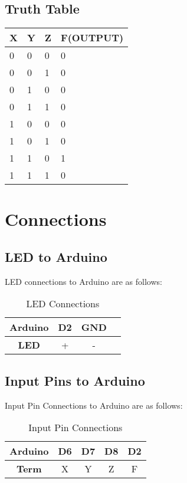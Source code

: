 \documentclass[a4paper,11pt]{article}
\newcommand\HSPC{\rule{0pt}{4ex}\rule[-2.0ex]{0pt}{0pt}}
\begin{document}
\subsection{Truth Table}
\label{sec:ttf}
\begin{table}[!h]
        \centering
        
\begin{tabular}{|p{}|p{}|p{}|p{}|}
\hline 
 X & Y & Z & F(OUTPUT)\\
\hline 
 0 & 0 & 0 & 0 \\
\hline 
 0 & 0 & 1 & 0 \\
\hline 
 0 & 1 & 0 & 0 \\
\hline 
 0 & 1 & 1 & 0 \\
\hline 
 1 & 0 & 0 & 0 \\
\hline 
 1 & 0 & 1 & 0 \\
\hline 
 1 & 1 & 0 & 1 \\
\hline 
 1 & 1 & 1 & 0 \\
 \hline
\end{tabular}
        
        \end{table}

\newpage
\section{Connections}
    \subsection{LED to Arduino}
        LED connections to Arduino are as follows:
        \begin{table}[ht]
            \centering
            \begin{tabular}{|c |c |c |c |}
            \hline
                \textbf{Arduino} & D2 & GND \HSPC \\
            \hline
                \textbf{LED} & + & - \HSPC \\ 
            \hline
            \end{tabular}
            \caption{LED Connections}
            \label{tab:cnct_led}
        \end{table}
        
    \subsection{Input Pins to Arduino} {
        Input Pin Connections to Arduino are as follows:
        \begin{table}[ht]
            \centering
            \begin{tabular}{|c |c |c |c |c |}
            \hline
                \textbf{Arduino} & D6 & D7 & D8&D2 \HSPC \\
            \hline
                \textbf{Term} & X & Y & Z &F\HSPC \\
            \hline
            \end{tabular}
            \caption{Input Pin Connections}
            \label{tab:cnct_ip}
        \end{table}
    }
    
\end{document}

